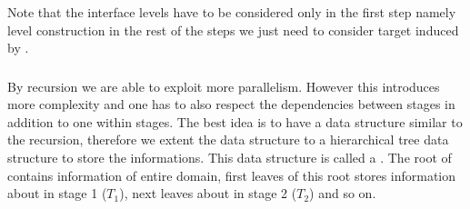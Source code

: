      Note that the interface levels have to be considered only in the first step namely level construction in the rest of the steps we just need to consider target \subgraphs induced by \levelGroups. 
     
	\subsubsection{\levelTree} \label{subsec:level_tree}
	By recursion we are able to exploit more parallelism. However this introduces more complexity and one has to also respect the dependencies between stages in addition to one within stages. The best idea is to have a data structure similar to the recursion, therefore we extent the \levelPtr data structure to a hierarchical tree data structure to store the informations. This data structure is called a \levelTree. The root of \levelTree contains information of entire domain, first leaves of this root stores information about \levelGroups  in stage 1 ($T_1$), next leaves about \levelGroups in stage 2 ($T_2$) and so on. 
	
